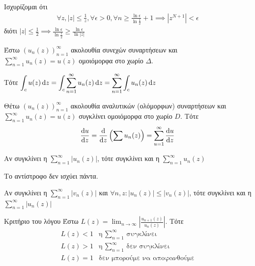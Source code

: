 \documentclass[12pt,a4paper,notitlepage,fleqn]{article}
\begin{document}
     Ισχυρίζομαι ότι
     \begin{align*}
     \forall z,|z|\leq\frac{1}{z}, \forall \epsilon>0, \forall n \geq
     \frac{\ln \epsilon}{\ln\frac{1}{2}}+1\implies\left|z^{N+1}\right|<\epsilon
     \end{align*}
     διότι \( \displaystyle
     |z| \leq \frac{1}{2}\implies
     \frac{\ln\epsilon}{\ln\frac{1}{2}} \geq \frac{\ln\epsilon}{\ln|z|} \)

     \begin{theorem*}[width=.7\textwidth]{}
     	Έστω \( \left(u_n(z)\right)_{n=1}^\infty \) ακολουθία συνεχών συναρτήσεων
     	και \( \sum_{n=1}^\infty u_n(z)=u(z) \) ομοιόμορφα στο χωρίο \( \Delta \).

     	Τότε \(\displaystyle
     	\int_c u(z)\mathop{}\!\mathrm{d} z = \int_c \sum_{n=1}^\infty u_n(z)\mathop{}\!\mathrm{d} z
     	= \sum_{n=1}^\infty \int_c u_n(z)\mathop{}\!\mathrm{d} z
     	\)
     \end{theorem*}
     \begin{theorem*}[width=.7\textwidth]{}
     	Θέτω \( \left( u_n(z) \right)_{n=1}^\infty \) ακολουθία αναλυτικών (ολόμορφων)
     	συναρτήσεων και \( \sum_{n=1}^\infty u_n(z) = u(z)\) συγκλίνει ομοιόμορφα
     	στο χωρίο \( D \). Τότε \[
     	\od{u}{z} = \od{}{z}\left(\sum u_n(z) \right) = \sum_{u=1}^\infty
     	\od{u}{z}
     	\]
     \end{theorem*}

     \begin{theorem*}{}
     	Αν συγκλίνει η \( \displaystyle \sum_{n=1}^\infty \left|u_n(z)\right| \),
     	τότε συγκλίνει και η \( \displaystyle \sum_{n=1}^\infty u_n(z)\)

     	Το αντίστροφο δεν ισχύει πάντα.
     \end{theorem*}

     \begin{theorem*}{}
     	Αν συγκλίνει η \( \displaystyle \sum_{n=1}^\infty \left|v_n(z)\right| \)
     	και \( \forall n,z:\left|u_n(z)\right| \leq \left|v_n(z)\right|\),
        τότε συγκλίνει και η \( \displaystyle \sum_{n=1}^\infty \left|
        u_n(z)
        \right| \)
     \end{theorem*}

     \begin{theorem*}{Κριτήριο του λόγου}
     	Έστω \( \displaystyle L(z) = \lim_{n\to \infty} \left|
     	\frac{u_{n+1}(z)}{u_n(z)}
     	\right| \). Τότε
     	\[
     	\begin{array}{ll}
     	L(z) < 1 & \text{η $\displaystyle\sum_{n=1}^\infty$ συγκλίνει} \\
     	L(z) > 1 & \text{η $\displaystyle\sum_{n=1}^\infty$ δεν συγκλίνει} \\
     	L(z) = 1 & \text{δεν μπορούμε να αποφανθούμε} \\
     	\end{array}
     	\]
     \end{theorem*}
\end{document}
